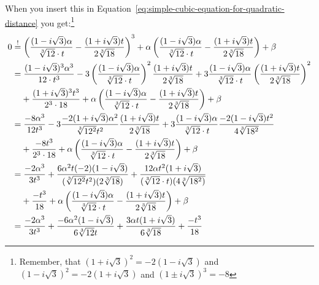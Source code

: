 
When you insert this in Equation~\ref{eq:simple-cubic-equation-for-quadratic-distance}
you get:\footnote{Remember, that $(1+i\sqrt{3})^2 = -2 (1-i \sqrt{3})$ and $(1-i \sqrt{3})^2 = -2 (1+i \sqrt{3})$
and $(1 \pm i \sqrt{3})^3 = -8$}
\begin{align}
 0 &\stackrel{!}{=} \left( \frac{(1-i \sqrt{3}) \alpha}{\sqrt[3]{12} \cdot t}
     -\frac{(1+i\sqrt{3}) t}{2\sqrt[3]{18}} \right)^3 
     + \alpha \left ( \frac{(1-i \sqrt{3}) \alpha}{\sqrt[3]{12} \cdot t} -\frac{(1+i\sqrt{3}) t}{2\sqrt[3]{18}}\right )
     + \beta\\%
    &= \frac{(1-i \sqrt{3})^3 \alpha^3}{12 \cdot t^3}
       - 3 \left (\frac{(1-i \sqrt{3}) \alpha}{\sqrt[3]{12} \cdot t} \right )^2 \frac{(1+i\sqrt{3}) t}{2\sqrt[3]{18}}
       + 3 \frac{(1-i \sqrt{3}) \alpha}{\sqrt[3]{12} \cdot t} \left (\frac{(1+i\sqrt{3}) t}{2\sqrt[3]{18}} \right)^2\\
    &\hphantom{{}=}
       + \frac{(1+i\sqrt{3})^3 t^3}{2^3 \cdot 18}
       + \alpha \left ( \frac{(1-i \sqrt{3}) \alpha}{\sqrt[3]{12} \cdot t} -\frac{(1+i\sqrt{3}) t}{2\sqrt[3]{18}}\right )
       + \beta\\%
    &= \frac{-8 \alpha^3}{12t^3}
       - 3 \frac{-2(1+i \sqrt{3}) \alpha^2}{\sqrt[3]{12^2} t^2} \frac{(1+i\sqrt{3}) t}{2\sqrt[3]{18}}
       + 3 \frac{(1-i \sqrt{3}) \alpha}{\sqrt[3]{12} \cdot t} \frac{-2(1-i\sqrt{3}) t^2}{4\sqrt[3]{18^2}}\\
    &\hphantom{{}=}
       + \frac{-8 t^3}{2^3 \cdot 18}
       + \alpha \left ( \frac{(1-i \sqrt{3}) \alpha}{\sqrt[3]{12} \cdot t} -\frac{(1+i\sqrt{3}) t}{2\sqrt[3]{18}}\right )
       + \beta\\%
    &= \frac{-2 \alpha^3}{3t^3}
       + \frac{6 \alpha^2 t (-2)(1-i \sqrt{3})}{(\sqrt[3]{12^2} t^2)(2\sqrt[3]{18})}
       + \frac{12 \alpha t^2 (1+i \sqrt{3})}{(\sqrt[3]{12} \cdot t)(4\sqrt[3]{18^2)}}\\
    &\hphantom{{}=}
       + \frac{- t^3}{18}
       + \alpha \left ( \frac{(1-i \sqrt{3}) \alpha}{\sqrt[3]{12} \cdot t} -\frac{(1+i\sqrt{3}) t}{2\sqrt[3]{18}}\right )
       + \beta\\%
    &= \frac{-2 \alpha^3}{3t^3}
       + \frac{-6 \alpha^2 (1-i \sqrt{3})}{6 \sqrt[3]{12} t}
       + \frac{3 \alpha t (1+i \sqrt{3})}{6\sqrt[3]{18}}
       + \frac{- t^3}{18}\\

\end{align}
